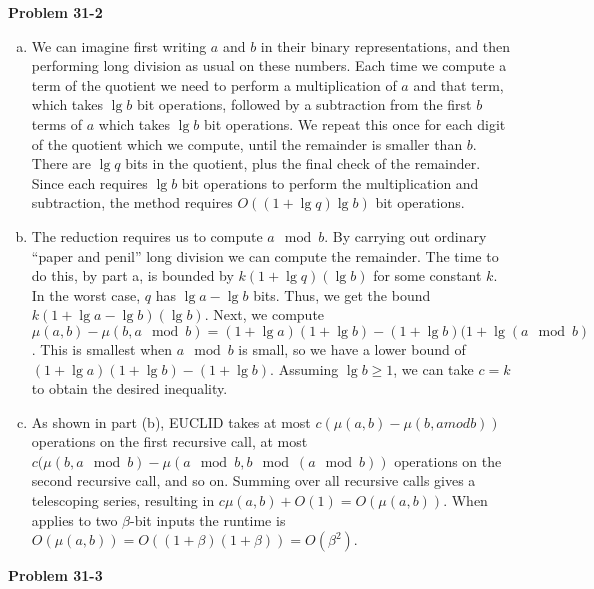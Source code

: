 \documentclass{article}
\begin{document}
\noindent\textbf{Problem 31-2}\\

\begin{enumerate}[a.]
\item We can imagine first writing $a$ and $b$ in their binary representations, and then performing long division as usual on these numbers.  Each time we compute a term of the quotient we need to perform a multiplication of $a$ and that term, which takes $\lg b$ bit operations, followed by a subtraction from the first $b$ terms of $a$ which takes $\lg b$ bit operations.  We repeat this once for each digit of the quotient which we compute, until the remainder is smaller than $b$.  There are $\lg q$ bits in the quotient, plus the final check of the remainder.  Since each requires $\lg b$ bit operations to perform the multiplication and subtraction, the method requires $O((1 + \lg q)\lg b)$ bit operations. \\

\item The reduction requires us to compute $a \mod b$.  By carrying out ordinary ``paper and penil'' long division we can compute the remainder.  The time to do this, by part a, is bounded by $k(1 + \lg q)(\lg b)$ for some constant $k$.  In the worst case, $q$ has $\lg a - \lg b$ bits.  Thus, we get the bound $k(1 + \lg a - \lg b)(\lg b)$.  Next, we compute $\mu(a,b) - \mu(b,a \mod b) = (1+\lg a)(1+\lg b) - (1 + \lg b)(1+\lg(a \mod b)$.  This is smallest when $a \mod b$ is small, so we have a lower bound of $(1+\lg a)(1+\lg b) - (1+\lg b)$.  Assuming $\lg b \geq 1$, we can take $c = k$ to obtain the desired inequality. 

\item As shown in part (b), EUCLID takes at most $c(\mu(a,b) - \mu(b,a mod b))$ operations on the first recursive call, at most $c(\mu(b,a\mod b) - \mu(a \mod b, b \mod (a \mod b))$ operations on the second recursive call, and so on. Summing over all recursive calls gives a telescoping series, resulting in $c\mu(a,b) + O(1) = O(\mu(a,b))$. When applies to two $\beta$-bit inputs the runtime is $O(\mu(a,b)) = O((1+\beta)(1+\beta)) = O(\beta^2)$. 
\end{enumerate}


\noindent\textbf{Problem 31-3}\\
\end{document}
